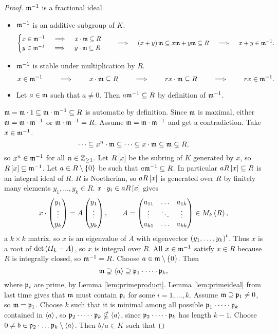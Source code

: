 \begin{proof}
$ \mm^{-1} $ is a fractional ideal.
\begin{itemize}
\item $ \mm^{-1} $ is an additive subgroup of $ K $.
$$
\begin{cases}
x \in \mm^{-1} \quad \implies \quad x \cdot \mm \subseteq R \\
y \in \mm^{-1} \quad \implies \quad y \cdot \mm \subseteq R
\end{cases}
\quad \implies \quad \rb{x + y}\mm \subseteq x\mm + y\mm \subseteq R \quad \implies \quad x + y \in \mm^{-1}.
$$
\item $ \mm^{-1} $ is stable under multiplication by $ R $.
$$ x \in \mm^{-1} \qquad \implies \qquad x \cdot \mm \subseteq R \qquad \implies \qquad rx \cdot \mm \subseteq R \qquad \implies \qquad rx \in \mm^{-1}. $$
\item Let $ a \in \mm $ such that $ a \ne 0 $. Then $ a\mm^{-1} \subseteq R $ by definition of $ \mm^{-1} $.
\end{itemize}
$ \mm = \mm \cdot 1 \subseteq \mm \cdot \mm^{-1} \subseteq R $ is automatic by definition. Since $ \mm $ is maximal, either $ \mm = \mm \cdot \mm^{-1} $ or $ \mm \cdot \mm^{-1} = R $. Assume $ \mm = \mm \cdot \mm^{-1} $ and get a contradiction. Take $ x \in \mm^{-1} $.
$$ \dots \subseteq x^n \cdot \mm \subseteq \dots \subseteq x \cdot \mm \subseteq \mm \subsetneq R, $$
so $ x^n \in \mm^{-1} $ for all $ n \in \Z_{\ge 1} $. Let $ R\sb{x} $ be the subring of $ K $ generated by $ x $, so $ R\sb{x} \subseteq \mm^{-1} $. Let $ a \in R \setminus \cb{0} $ be such that $ a\mm^{-1} \subseteq R $. In particular $ aR\sb{x} \subseteq R $ is an integral ideal of $ R $. $ R $ is Noetherian, so $ aR\sb{x} $ is generated over $ R $ by finitely many elements $ y_1, \dots, y_k \in R $. $ x \cdot y_i \in aR\sb{x} $ gives
$$ x \cdot \threebyone{y_1}{\vdots}{y_k} = A\threebyone{y_1}{\vdots}{y_k}, \qquad A = \threebythree{a_{11}}{\dots}{a_{1k}}{\vdots}{\ddots}{\vdots}{a_{k1}}{\dots}{a_{kk}} \in M_k\rb{R}, $$
a $ k \times k $ matrix, so $ x $ is an eigenvalue of $ A $ with eigenvector $ \rb{y_1, \dots, y_k}^t $. Thus $ x $ is a root of $ \det\rb{tI_k - A} $, so $ x $ is integral over $ R $. All $ x \in \mm^{-1} $ satisfy $ x \in R $ because $ R $ is integrally closed, so $ \mm^{-1} = R $. Choose $ a \in \mm \setminus \cb{0} $. Then
$$ \mm \supsetneq \ab{a} \supseteq \pp_1 \cdot \dots \cdot \pp_k, $$
where $ \pp_i $ are prime, by Lemma \ref{lem:primeproduct}. Lemma \ref{lem:primeideal} from last time gives that $ \mm $ must contain $ \pp_i $ for some $ i = 1, \dots, k $. Assume $ \mm \supseteq \pp_1 \ne 0 $, so $ \mm = \pp_1 $. Choose $ k $ such that it is minimal among all possible $ \pp_1 \cdot \dots \cdot \pp_k $ contained in $ \ab{a} $, so $ \pp_2 \cdot \dots \cdot \pp_k \nsubseteq \ab{a} $, since $ \pp_2 \cdot \dots \cdot \pp_k $ has length $ k - 1 $. Choose $ 0 \ne b \in \pp_2 \cdot \dots \pp_k \setminus \ab{a} $. Then $ b / a \in K $ such that

\end{proof}
